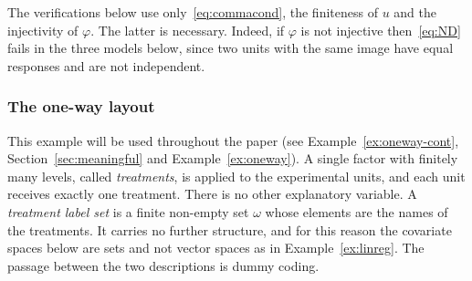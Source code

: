 \documentclass[11pt,a4paper]{article}
\theoremstyle{plain}
\theoremstyle{definition}
\theoremstyle{remark}
\begin{document}
The verifications below use only~\eqref{eq:commacond}, the finiteness of $u$
and the injectivity of $\varphi$. The latter is necessary. Indeed, if $\varphi$
is not injective then~\eqref{eq:ND} fails in the three models below, since two
units with the same image have equal responses and are not independent.

\subsubsection{The one-way layout}

This example will be used throughout the paper (see
Example~\ref{ex:oneway-cont}, Section~\ref{sec:meaningful} and
Example~\ref{ex:oneway}). A single factor with finitely many levels, called
\emph{treatments}, is applied to the experimental units, and each unit receives
exactly one treatment. There is no other explanatory variable. A
\emph{treatment label set} is a finite non-empty set $\omega$ whose elements
are the names of the treatments. It carries no further structure, and for this
reason the covariate spaces below are sets and not vector spaces as in
Example~\ref{ex:linreg}. The passage between the two descriptions is dummy
coding.
\end{document}
